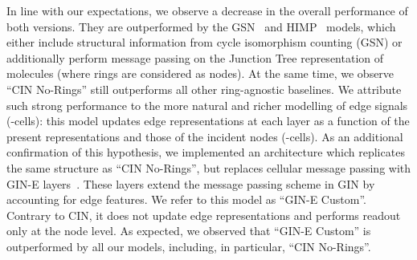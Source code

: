 \documentclass{article}
\begin{document}
In line with our expectations, we observe a decrease in the overall performance of both versions. They are outperformed by the GSN~\citep{bouritsas2020improving} and HIMP~\citep{Fey2020_himp} models, which either include structural information from cycle isomorphism counting (GSN) or additionally perform message passing on the Junction Tree representation of molecules (where rings are considered as nodes). At the same time, we observe ``CIN No-Rings'' still outperforms all other ring-agnostic baselines. We attribute such strong performance to the more natural and richer modelling of edge signals (-cells): this model updates edge representations at each layer as a function of the present representations and those of the incident nodes (-cells). As an additional confirmation of this hypothesis, we implemented an architecture which replicates the same structure as ``CIN No-Rings'', but replaces cellular message passing with GIN-E layers~\citep{hu2020pretraining}. These layers extend the message passing scheme in GIN by accounting for edge features. We refer to this model as ``GIN-E Custom''. Contrary to CIN, it does not update edge representations and performs readout only at the node level. As expected, we observed that ``GIN-E Custom'' is outperformed by all our models, including, in particular, ``CIN No-Rings''.
\end{document}

